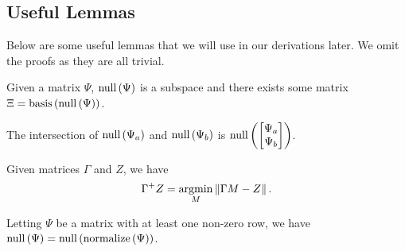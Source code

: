 \subsection{Useful Lemmas}
Below are some useful lemmas that we will use in our derivations later. We omit the proofs as they are all trivial.

\begin{lemma}\label{lem:null-space-is-subspace}
Given a matrix $\Psi$, $\text{\rm null}\left(\Psi\right)$ is a subspace and there exists some matrix $\Xi = \text{\rm basis}\left(\text{\rm null}\left(\Psi\right)\right)$.
\end{lemma}

\begin{lemma}\label{lem:union-of-null-space}
The intersection of $\text{\rm null}\left(\Psi_a\right)$ and $\text{\rm null}\left(\Psi_b\right)$ is $\text{\rm null}\left(\begin{bmatrix}\Psi_a\\ \Psi_b\end{bmatrix}\right)$.
\end{lemma}

\begin{lemma}\label{lem:pinv-equal-regression}
Given matrices $\Gamma$ and $Z$, we have
\begin{align*}
\Gamma^+ Z = \operatorname*{argmin}\limits_{M} \left\lVert \Gamma M - Z \right\rVert.
\end{align*}
\end{lemma}

\begin{lemma}\label{lem:normalization}
Letting $\Psi$ be a matrix with at least one non-zero row, we have
$\text{\rm null}\left(\Psi\right) = \text{\rm null}\left(\text{\rm normalize}\left(\Psi\right)\right)$.
\end{lemma}


